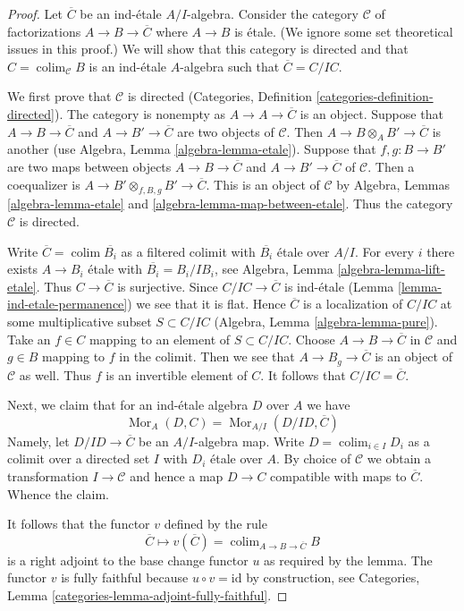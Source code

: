 \documentclass[10pt,a4paper]{amsart}
\theoremstyle{plain}
\theoremstyle{definition}
\theoremstyle{remark}
\numberwithin{equation}{subsection}
\def\colim{\mathop{\mathrm{colim}}\nolimits}
\def\Mor{\mathop{\mathrm{Mor}}\nolimits}
\begin{document}
\begin{proof}
Let $\overline{C}$ be an ind-\'etale $A/I$-algebra.
Consider the category $\mathcal{C}$ of factorizations
$A \to B \to \overline{C}$ where $A \to B$ is \'etale.
(We ignore some set theoretical issues in this proof.)
We will show that this category is directed and that
$C = \colim_\mathcal{C} B$ is an ind-\'etale $A$-algebra
such that $\overline{C} = C/IC$.

\medskip\noindent
We first prove that $\mathcal{C}$ is directed
(Categories, Definition \ref{categories-definition-directed}).
The category is nonempty as $A \to A \to \overline{C}$ is an object.
Suppose that $A \to B \to \overline{C}$ and $A \to B' \to \overline{C}$
are two objects of $\mathcal{C}$. Then $A \to B \otimes_A B' \to \overline{C}$
is another (use Algebra, Lemma \ref{algebra-lemma-etale}).
Suppose that $f, g : B \to B'$ are two maps between
objects $A \to B \to \overline{C}$ and $A \to B' \to \overline{C}$
of $\mathcal{C}$. Then a coequalizer is
$A \to B' \otimes_{f, B, g} B' \to \overline{C}$.
This is an object of $\mathcal{C}$ by
Algebra, Lemmas \ref{algebra-lemma-etale} and
\ref{algebra-lemma-map-between-etale}.
Thus the category $\mathcal{C}$ is directed.

\medskip\noindent
Write $\overline{C} = \colim \overline{B_i}$ as a filtered colimit with
$\overline{B_i}$ \'etale over $A/I$. For every $i$
there exists $A \to B_i$ \'etale with $\overline{B_i} = B_i/IB_i$, see
Algebra, Lemma \ref{algebra-lemma-lift-etale}.
Thus $C \to \overline{C}$ is surjective.
Since $C/IC \to \overline{C}$ is ind-\'etale
(Lemma \ref{lemma-ind-etale-permanence})
we see that it is flat. Hence $\overline{C}$ is a localization of
$C/IC$ at some multiplicative subset $S \subset C/IC$
(Algebra, Lemma \ref{algebra-lemma-pure}).
Take an $f \in C$ mapping to an element of $S \subset C/IC$.
Choose $A \to B \to \overline{C}$ in $\mathcal{C}$ and $g \in B$
mapping to $f$ in the colimit. Then we see that $A \to B_g \to \overline{C}$
is an object of $\mathcal{C}$ as well. Thus $f$ is an invertible
element of $C$. It follows that $C/IC = \overline{C}$.

\medskip\noindent
Next, we claim that for an ind-\'etale algebra $D$ over $A$ we have
$$
\Mor_A(D, C) = \Mor_{A/I}(D/ID, \overline{C})
$$
Namely, let $D/ID \to \overline{C}$ be an $A/I$-algebra map.
Write $D = \colim_{i \in I} D_i$ as a colimit over a directed set $I$
with $D_i$ \'etale over $A$. By choice of $\mathcal{C}$
we obtain a transformation $I \to \mathcal{C}$ and hence a map
$D \to C$ compatible with maps to $\overline{C}$. Whence the claim.

\medskip\noindent
It follows that the functor $v$ defined by the rule
$$
\overline{C} 
\longmapsto
v(\overline{C}) = \colim_{A \to B \to \overline{C}} B
$$
is a right adjoint to the base change functor $u$ as required by the lemma.
The functor $v$ is fully faithful because
$u \circ v = \text{id}$ by construction, see
Categories, Lemma \ref{categories-lemma-adjoint-fully-faithful}.
\end{proof}
\end{document}
